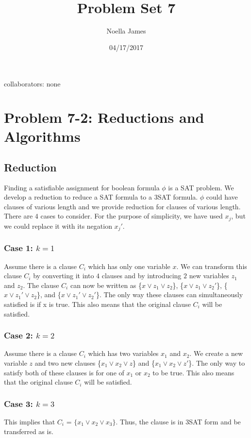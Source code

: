 \documentclass{article}
\theoremstyle{definition}
\theoremstyle{remark}
\theoremstyle{plain}
\begin{document}
\title{Problem Set 7}
\date{04/17/2017}
\author{Noella James}
\maketitle
collaborators: none\\

\section*{Problem 7-2: Reductions and Algorithms}

\subsection*{Reduction}

Finding a satisfiable assignment for boolean formula $\phi$ is a SAT problem. We develop a reduction to reduce a SAT formula to a 3SAT formula. $\phi$ could have clauses of various length and we provide reduction for clauses of various length. There are $4$ cases to consider. For the purpose of simplicity, we have used $x_j$, but we could replace it with its negation $x_j'$.  

\subsubsection*{Case 1: $k = 1$} 
Assume there is a clause $C_i$ which has only one variable $x$. We can transform this clause $C_i$ by converting it into $4$ clauses and by introducing $2$ new variables $z_1$ and $z_2$. The clause $C_i$ can now be written as \{$x \vee z_1 \vee z_2$\}, \{$x \vee z_1 \vee z_2'$\}, \{$x \vee z_1' \vee z_2$\}, and \{$x \vee z_1' \vee z_2'$\}. The only way these clauses can simultaneously satisfied is if x is true. This also means that the original clause $C_i$ will be satisfied. 

\subsubsection*{Case 2: $k = 2$} 
Assume there is a clause $C_i$ which has two variables $x_1$ and $x_2$. We create a new variable $z$ and two new clauses \{$x_1 \vee x_2 \vee z$\} and \{$x_1 \vee x_2 \vee z'$\}. The only way to satisfy both of these clauses is for one of $x_1$ or $x_2$ to be true. This also means that the original clause $C_i$ will be satisfied.

\subsubsection*{Case 3: $k = 3$} 
This implies that $C_i$ = $\{x_1 \vee x_2 \vee x_3\}$. Thus, the clause is in 3SAT form and be transferred as is.
\end{document}
